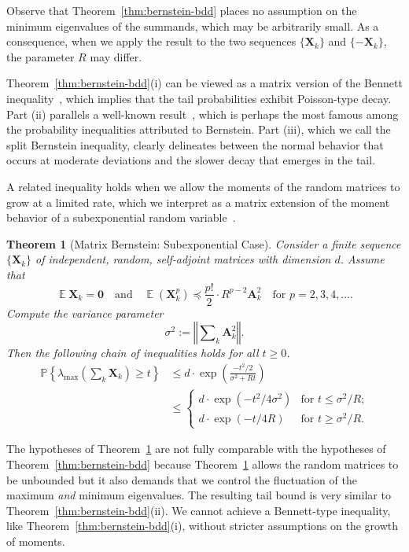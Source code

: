 \documentclass[11pt,letterpaper,twoside,reqno,draft]{amsart}
\newtheorem{thm}{Theorem}
\theoremstyle{remark}
\numberwithin{equation}{section}
\numberwithin{thm}{section}
\begin{document}
Observe that Theorem~\ref{thm:bernstein-bdd} places no assumption on the minimum eigenvalues of the summands, which may be arbitrarily small.  As a consequence, when we apply the result to the two sequences $\{ {\bm{{X}}}_k \}$ and $\{ - {\bm{{X}}}_k \}$, the parameter $R$ may differ.

Theorem~\ref{thm:bernstein-bdd}(i) can be viewed as a matrix version of the Bennett inequality~\cite[Thm.~5]{Lug09:Concentration-Measure}, which implies that the tail probabilities exhibit Poisson-type decay.  Part (ii) parallels a well-known result~\cite[Thm.~6]{Lug09:Concentration-Measure}, which is perhaps the most famous among the probability inequalities attributed to Bernstein.  Part (iii), which we call the split Bernstein inequality, clearly delineates between the normal behavior that occurs at moderate deviations and the slower decay that emerges in the tail.

A related inequality holds when we allow the moments of the random matrices to grow at a limited rate, which we interpret as a matrix extension of the moment behavior of a subexponential random variable~\cite[Lem.~4.1.9]{PG02:Decoupling}.

\begin{thm}[Matrix Bernstein: Subexponential Case] \label{thm:bernstein-subexp}
Consider a finite sequence $\{ {\bm{{X}}}_k \}$ of independent, random, self-adjoint matrices with dimension $d$.  Assume that
$$
{\operatorname{\mathbb{E}}} {\bm{{X}}}_k = {\bm{{0}}}
\quad\text{and}\quad
{\operatorname{\mathbb{E}}}( {\bm{{X}}}_k^p ) {\preccurlyeq} \frac{p!}{2} \cdot R^{p-2} {\bm{{A}}}_k^2
\quad\text{for $p = 2, 3, 4, \dots$.}
$$
Compute the variance parameter
$$
\sigma^2 := {\left\Vert {{ \sum\nolimits_k {\bm{{A}}}_k^2 }} \right\Vert}.
$$
Then the following chain of inequalities holds for all $t \geq 0$.
\begin{align*}
{\mathbb{P}\left\{ {{ \lambda_{\max}\left( \sum\nolimits_k {\bm{{X}}}_k \right) \geq t }} \right\}}
	&\leq d \cdot \exp \left( \frac{-t^2/2}{\sigma^2 + Rt} \right)
		\tag{i} \\
	&\leq \begin{cases}
		d \cdot \exp( -t^2/4\sigma^2 ) &
		\text{for $t \leq \sigma^2 / R$;} \\
		d \cdot \exp( -t/4R  ) &
		\text{for $t \geq \sigma^2 / R$.}
	\end{cases} \tag{ii}
\end{align*}
\end{thm}

The hypotheses of Theorem~\ref{thm:bernstein-subexp} are not fully comparable with the hypotheses of Theorem~\ref{thm:bernstein-bdd} because Theorem~\ref{thm:bernstein-subexp} allows the random matrices to be unbounded but it also demands that we control the fluctuation of the maximum \emph{and} minimum eigenvalues.  The resulting tail bound is very similar to Theorem~\ref{thm:bernstein-bdd}(ii).  We cannot achieve a Bennett-type inequality, like Theorem~\ref{thm:bernstein-bdd}(i), without stricter assumptions on the growth of moments.
\end{document}
